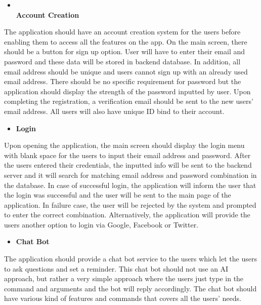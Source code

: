 \documentclass[conference]{IEEEtran}
\begin{document}
\begin{itemize}
\item \textbf{\\Account Creation}
\end{itemize}
\par The application should have an account creation system for the users before enabling them to access all the features on the app. On the main screen, there should be a button for sign up option. User will have to enter their email and password and these data will be stored in backend database. In addition, all email address should be unique and users cannot sign up with an already used email address. There should be no specific requirement for password but the application should display the strength of the password inputted by user. Upon completing the registration, a verification email should be sent to the new users’ email address. All users will also have unique ID bind to their account.\\
\begin{itemize}
\item \textbf{Login}
\end{itemize}
\par Upon opening the application, the main screen should display the login menu with blank space for the users to input their email address and password. After the users entered their credentials, the inputted info will be sent to the backend server and it will search for matching email address and password combination in the database. In case of successful login, the application will inform the user that the login was successful and the user will be sent to the main page of the application. In failure case, the user will be rejected by the system and prompted to enter the correct combination.  Alternatively, the application will provide the users another option to login via Google, Facebook or Twitter.\\
\begin{itemize}
\item \textbf{Chat Bot}
\end{itemize}
\par The application should provide a chat bot service to the users which let the users to ask questions and set a reminder. This chat bot should not use an AI approach, but rather a very simple approach where the users just type in the command and arguments and the bot will reply accordingly. The chat bot should have various kind of features and commands that covers all the users’ needs.\\
\end{document}
